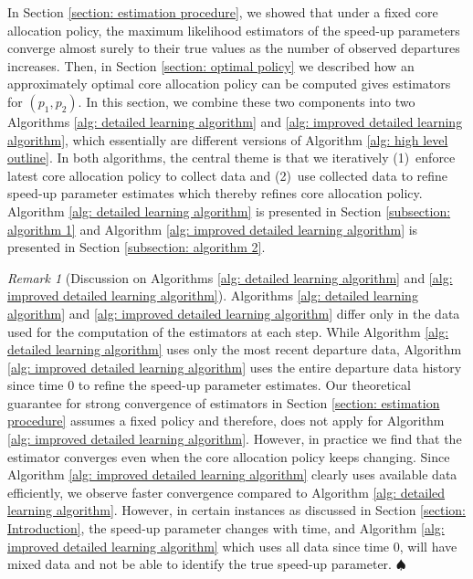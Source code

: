 \documentclass[11pt]{article}
\theoremstyle{remark}
\newtheorem{remark}[thm]{Remark}
\theoremstyle{definition}
\numberwithin{equation}{section}
\begin{document}
In Section \ref{section: estimation procedure}, we showed that under a fixed core allocation policy, the maximum likelihood estimators of the speed-up parameters converge almost surely to their true values as the number of observed departures increases.
Then, in Section \ref{section: optimal policy} we described how an approximately optimal core allocation policy can be computed gives estimators for $(p_1, p_2)$.
In this section, we combine these two components into two Algorithms \ref{alg: detailed learning algorithm} and \ref{alg: improved detailed learning algorithm}, which essentially are different versions of Algorithm \ref{alg: high level outline}.
In both algorithms, the central theme is that we iteratively (1)~enforce latest core allocation policy to collect data and (2)~use collected data to refine speed-up parameter estimates which thereby refines core allocation policy.
Algorithm \ref{alg: detailed learning algorithm} is presented in Section \ref{subsection: algorithm 1} and Algorithm \ref{alg: improved detailed learning algorithm} is presented in Section \ref{subsection: algorithm 2}.

\begin{remark}[Discussion on Algorithms \ref{alg: detailed learning algorithm} and \ref{alg: improved detailed learning algorithm}]
    Algorithms \ref{alg: detailed learning algorithm} and \ref{alg: improved detailed learning algorithm} differ only in the data used for the computation of the estimators at each step.
    While Algorithm \ref{alg: detailed learning algorithm} uses only the most recent departure data, Algorithm \ref{alg: improved detailed learning algorithm} uses the entire departure data history since time 0 to refine the speed-up parameter estimates.
    Our theoretical guarantee for strong convergence of estimators in Section \ref{section: estimation procedure} assumes a fixed policy and therefore, does not apply for Algorithm \ref{alg: improved detailed learning algorithm}.
    However, in practice we find that the estimator converges even when the core allocation policy keeps changing.
    Since Algorithm \ref{alg: improved detailed learning algorithm} clearly uses available data efficiently, we observe faster convergence compared to Algorithm \ref{alg: detailed learning algorithm}.
    However, in certain instances as discussed in Section \ref{section: Introduction}, the speed-up parameter changes with time, and Algorithm \ref{alg: improved detailed learning algorithm} which uses all data since time 0, will have mixed data and not be able to identify the true speed-up parameter.
    \hfill $\spadesuit$
\end{remark}
\end{document}
